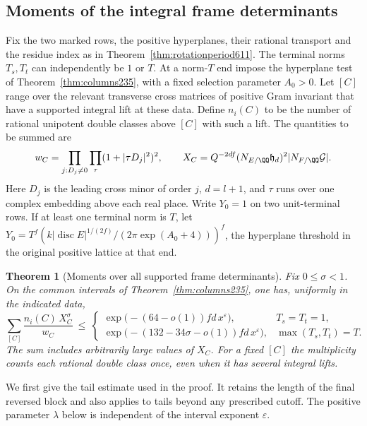 \documentclass[a4paper,11pt]{article}
\newtheorem{theorem}[proposition]{Theorem}
\theoremstyle{definition}
\theoremstyle{remark}
\numberwithin{equation}{section}
\begin{document}
\subsection{Moments of the integral frame determinants}
\label{sec:orientationmoment613}

Fix the two marked rows, the positive hyperplanes, their rational
transport and the residue index as in
Theorem~\ref{thm:rotationperiod611}. The terminal norms \(T_s,T_t\)
can independently be \(1\) or \(T\). At a norm-\(T\) end impose
the hyperplane test of Theorem~\ref{thm:columns235}, with a fixed
selection parameter \(A_0>0\). Let \([C]\) range over the relevant
transverse cross matrices of positive Gram invariant that have a
supported integral lift at these data. Define \(n_i(C)\) to be the
number of rational unipotent double classes above \([C]\) with
such a lift. The quantities to be summed are
\[
 w_C=\prod_{j:D_j\ne0}\prod_{\tau}(1+|\tau D_j|^2)^2,\qquad
 X_C=Q^{-2df}(N_{E/\QQ}\mathfrak h_d)^2|N_{F/\QQ}\mathcal G|.
\]
Here \(D_j\) is the leading cross minor of order \(j\), \(d=l+1\),
and \(\tau\) runs over one complex embedding above each real place.
Write \(Y_0=1\) on two unit-terminal rows. If at least one terminal
norm is \(T\), let \(Y_0=T^f(k|\operatorname{disc}E|^{1/(2f)}
/(2\pi\exp(A_0+4)))^f\), the hyperplane threshold in the original
positive lattice at that end.

\begin{theorem}[Moments over all supported frame determinants]
\leavevmode\label{thm:orientationmoment613}
Fix \(0\le \sigma<1\). On the common intervals of
Theorem~\ref{thm:columns235}, one has, uniformly in the indicated
data,
\[
 \sum_{[C]}\frac{n_i(C)\,X_C^\sigma}{w_C}
 \ \le\
 \begin{cases}
  \exp\!\bigl(-(64-o(1))fd\,x^\varepsilon\bigr),
                         &T_s=T_t=1,\\
  \exp\!\bigl(-(132-34\sigma-o(1))fd\,x^\varepsilon\bigr),
                         &\max(T_s,T_t)=T .
 \end{cases}
\]
The sum includes arbitrarily large values of \(X_C\). For a fixed
\([C]\) the multiplicity counts each rational double class once,
even when it has several integral lifts.
\end{theorem}

We first give the tail estimate used in the proof. It retains the
length of the final reversed block and also applies to tails beyond
any prescribed cutoff. The positive parameter \(\lambda\) below is
independent of the interval exponent \(\varepsilon\).
\end{document}
